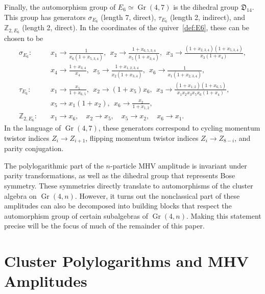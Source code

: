 \documentclass[12pt]{article}
\DeclareMathOperator{\Gr}{Gr}
\begin{document}
Finally, the automorphism group of $E_6 \simeq \Gr(4,7)$ is the dihedral group ${\mathfrak D}_{14}$. This group has generators $\sigma_{E_6}$ (length 7, direct), $\tau_{E_6}$ (length 2, indirect), and $\mathbb{Z}_{2,E_6}$ (length 2, direct). In the coordinates of the quiver~\eqref{def:E6}, these can be chosen to be 
\begin{align}
  \sigma_{E_6}:\quad 
    &x_1\to \frac{1}{x_6 (1+x_{5,3,4})},~~
    x_2\to \frac{1+x_{6,5,3,4}}{x_5 (1+x_{3,4})},~~
    x_3\to \frac{(1+x_{2,3,4}) (1+x_{5,3,4})}{x_3 (1+x_4)}, \nonumber \\
    &x_4\to \frac{1+x_{3,4}}{x_4},~~
    x_5\to \frac{1+x_{1,2,3,4}}{x_2 (1+x_{3,4})},~~
    x_6\to \frac{1}{x_1 (1+x_{2,3,4})},\nonumber \\[2ex]
  \tau_{E_6}:\quad
    &x_1\to \frac{x_5}{1+x_{6,5}},~~
    x_2\to (1+x_5) x_6,~~
    x_3\to \frac{(1+x_{1,2}) (1+x_{6,5})}{x_1 x_2 x_3 x_5 x_6 (1+x_4)},  \\
    &x_5\to x_1 (1+x_2),~~
    x_6\to \frac{x_2}{1+x_{1,2}}, \nonumber \\[2ex]
  \mathbb{Z}_{2,E_6}:\quad 
    &x_1\to x_6, \quad x_2\to x_5, \quad x_5\to x_2, \quad x_6\to x_1. \nonumber
\end{align}
In the language of $\Gr(4,7)$, these generators correspond to cycling momentum twistor indices $Z_i \to Z_{i+1}$, flipping momentum twistor indices $Z_i \to Z_{8-i}$, and parity conjugation. 

The polylogarithmic part of the $n$-particle MHV amplitude is invariant under parity transformations, as well as the dihedral group that represents Bose symmetry. These symmetries directly translate to automorphisms of the cluster algebra on $\Gr(4,n)$. However, it turns out the nonclassical part of these amplitudes can also be decomposed into building blocks that respect the automorphism group of certain subalgebras of $\Gr(4,n)$. Making this statement precise will be the focus of much of the remainder of this paper. 

\section{Cluster Polylogarithms and MHV Amplitudes} \label{sec:cluster_polylog_MHV_review}
\end{document}
